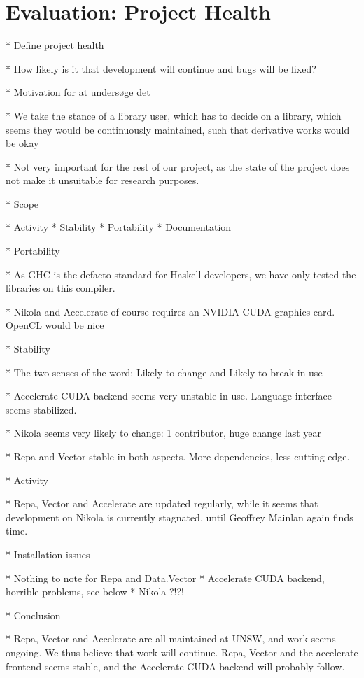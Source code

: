 \chapter{Evaluation: Project Health}

* Define project health
  
  * How likely is it that development will continue and bugs will be fixed?

* Motivation for at undersøge det
  
  * We take the stance of a library user, which has to decide on
    a library, which seems they would be continuously maintained, such
    that derivative works would be okay

  * Not very important for the rest of our project, as the state of
    the project does not make it unsuitable for research purposes.

* Scope
  
  * Activity
  * Stability
  * Portability
  * Documentation

* Portability 
  
  * As GHC is the defacto standard for Haskell developers, we have
    only tested the libraries on this compiler.

  * Nikola and Accelerate of course requires an NVIDIA CUDA graphics
    card. OpenCL would be nice

* Stability 
  
  * The two senses of the word: Likely to change and Likely to break in use

  * Accelerate CUDA backend seems very unstable in use. Language
    interface seems stabilized.

  * Nikola seems very likely to change: 1 contributor, huge change
    last year

  * Repa and Vector stable in both aspects. More dependencies,
    less cutting edge.

* Activity

  * Repa, Vector and Accelerate are updated regularly, while it seems
    that development on Nikola is currently stagnated, until Geoffrey
    Mainlan again finds time.

* Installation issues

  * Nothing to note for Repa and Data.Vector
  * Accelerate CUDA backend, horrible problems, see below
  * Nikola ?!?!

* Conclusion

  * Repa, Vector and Accelerate are all maintained at UNSW, and work
    seems ongoing. We thus believe that work will continue. Repa, Vector
    and the accelerate frontend seems stable, and the Accelerate CUDA
    backend will probably follow.

